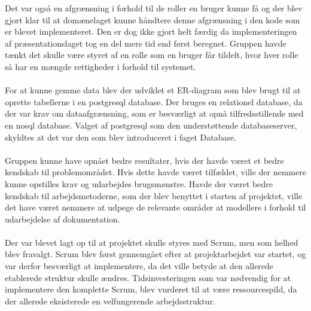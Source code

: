 Det var også en afgrænsning i forhold til de roller en bruger kunne få og der blev gjort klar til at domænelaget kunne håndtere denne afgrænsning i den kode som er blevet implementeret. 
Den er dog ikke gjort helt færdig da implementeringen af præsentationslaget tog en del mere tid end først beregnet. 
Gruppen havde tænkt det skulle være styret af en rolle som en bruger får tildelt, hvor hver rolle så har en mængde rettigheder i forhold til systemet. \\ \\
For at kunne gemme data blev der udviklet et ER-diagram som blev brugt til at oprette tabellerne i en postgresql database. 
Der bruges en relationel database, da der var krav om dataafgrænsning, som er besværligt at opnå tilfredsstillende med en nosql database. 
Valget af postgresql som den understøttende databaseserver, skyldtes at det var den som blev introduceret i faget Database. \\ \\
Gruppen kunne have opnået bedre resultater, hvis der havde været et bedre kendskab til problemområdet. 
Hvis dette havde været tilfældet, ville der nemmere kunne opstilles krav og udarbejdes brugsmønstre. 
Havde der været bedre kendskab til arbejdsmetoderne, som der blev benyttet i starten af projektet, ville det have været nemmere at udpege de relevante områder at modellere i forhold til udarbejdelse af dokumentation. \\ \\
Der var blevet lagt op til at projektet skulle styres med Scrum, men som helhed blev fravalgt. 
Scrum blev først gennemgået efter at projektarbejdet var startet, og var derfor besværligt at implementere, da det ville betyde at den allerede etablerede struktur skulle ændres. 
Tidsinvesteringen som var nødvendig for at implementere den komplette Scrum, blev vurderet til at være ressourcespild, da der allerede eksisterede en velfungerende arbejdsstruktur. \\
